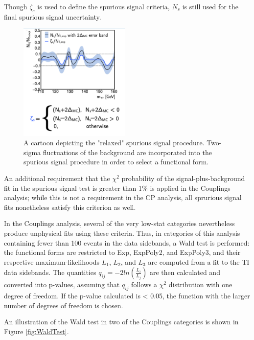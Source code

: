 Though $\zeta_{s}$ is used to define the spurious signal criteria, $N_{s}$ is still used for the final spurious signal uncertainty. 

\begin{figure}
\includegraphics[width=0.49\textwidth]{figures/sigbkgparam/SSRelaxed.png}
\caption{A cartoon depicting the "relaxed" spurious signal procedure. Two-sigma fluctuations of the background are incorporated into the spurious signal procedure in order to select a functional form.}
\label{fig:SSrelaxed}
\end{figure} 


An additional requirement that the $\chi^{2}$ probability of the signal-plus-background fit in the spurious signal test is greater than 1\% is applied in the Couplings analysis; while this is not a requirement in the CP analysis, all sprurious signal fits nonetheless satisfy this criterion as well.

In the Couplings analysis, several of the very low-stat categories nevertheless produce unphysical fits using these criteria. Thus, in categories of this analysis containing fewer than 100 events in the data sidebands, a Wald test is performed: the functional forms are restricted to Exp, ExpPoly2, and ExpPoly3, and their respective maximum-likelihoods $L_{1}$, $L_{2}$, and $L_{3}$ are computed from a fit to the TI data sidebands. The quantities $q_{ij} = -2 ln(\frac{L_{i}}{L_{j}})$ are then calculated and converted into p-values, assuming that $q_{ij}$ follows a $\chi^{2}$ distribution with one degree of freedom. If the p-value calculated is < 0.05, the function with the larger number of degrees of freedom is chosen. 

An illustration of the Wald test in two of the Couplings categories is shown in Figure \ref{fig:WaldTest}.

